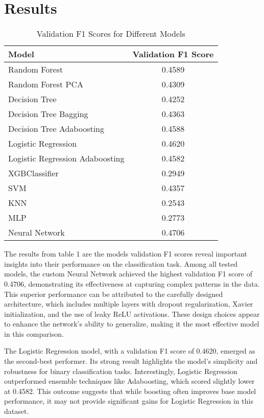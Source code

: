\documentclass{article} %
\begin{document}
\section{Results}

\begin{table}[ht!]
    \centering
    \begin{tabular}{|l|c|}
        \hline
        \textbf{Model} & \textbf{Validation F1 Score} \\ \hline
        Random Forest & 0.4589 \\ \hline
        Random Forest PCA & 0.4309 \\ \hline
        Decision Tree & 0.4252 \\ \hline
        Decision Tree Bagging & 0.4363 \\ \hline
        Decision Tree Adaboosting & 0.4588 \\ \hline
        Logistic Regression & 0.4620 \\ \hline
        Logistic Regression Adaboosting & 0.4582 \\ \hline
        XGBClassifier & 0.2949 \\ \hline
        SVM & 0.4357 \\ \hline
        KNN & 0.2543 \\ \hline
        MLP & 0.2773 \\ \hline
        Neural Network & 0.4706 \\ \hline
    \end{tabular}
    \caption{Validation F1 Scores for Different Models }
    \label{tab:validation-f1-scores}
\end{table}


The results from table 1 are the models validation F1 scores reveal important insights into their performance on the classification task. Among all tested models, the custom Neural Network achieved the highest validation F1 score of 0.4706, demonstrating its effectiveness at capturing complex patterns in the data. This superior performance can be attributed to the carefully designed architecture, which includes multiple layers with dropout regularization, Xavier initialization, and the use of leaky ReLU activations. These design choices appear to enhance the network's ability to generalize, making it the most effective model in this comparison.

The Logistic Regression model, with a validation F1 score of 0.4620, emerged as the second-best performer. Its strong result highlights the model's simplicity and robustness for binary classification tasks. Interestingly, Logistic Regression outperformed ensemble techniques like Adaboosting, which scored slightly lower at 0.4582. This outcome suggests that while boosting often improves base model performance, it may not provide significant gains for Logistic Regression in this dataset.
\end{document}
